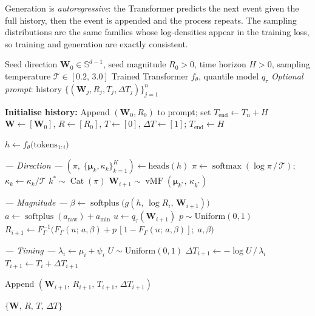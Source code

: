 \documentclass[11pt,a4paper]{article}
\newcommand{\bW}{\boldsymbol{W}}
\newcommand{\bmu}{\boldsymbol{\mu}}
\DeclareMathOperator{\vMF}{vMF}
\DeclareMathOperator{\Cat}{Cat}
\DeclareMathOperator{\softmax}{softmax}
\DeclareMathOperator{\softplus}{softplus}
\begin{document}
Generation is \emph{autoregressive}: the Transformer predicts the next
event given the full history, then the event is appended and the process
repeats.  The sampling distributions are the same families whose
log-densities appear in the training loss, so training and generation
are exactly consistent.

\begin{algorithm}[H]
\caption{Autoregressive cascade generation}\label{alg:generate}
\begin{algorithmic}[1]

\Require Seed direction $\bW_0 \in \mathbb{S}^{d-1}$,
         seed magnitude $R_0 > 0$,
         time horizon $H > 0$,
         sampling temperature $\mathcal{T} \in [0.2,\,3.0]$
\Require Trained Transformer $f_\theta$, quantile model $q_\tau$
\Require \textit{Optional prompt}:
         history $\{(\bW_j, R_j, T_j, \Delta T_j)\}_{j=1}^{n}$

\Statex
\State \textbf{Initialise history:}
  \State Append $(\bW_0, R_0)$ to prompt;
         set $T_{\text{end}} \gets T_n + H$
\Else
  \State $\bW \gets [\bW_0]$,\; $R \gets [R_0]$,\;
         $T \gets [0]$,\; $\Delta T \gets [1]$;\;
         $T_{\text{end}} \gets H$
\EndIf

\Statex
{}

  \Statex
  \State $h \gets f_\theta\!\bigl(\text{tokens}_{1:i}\bigr)$

  \Statex \textit{--- Direction ---}
  \State $(\pi,\;\{\bmu_k,\kappa_k\}_{k=1}^K) \gets \text{heads}(h)$
  \State $\pi \gets \softmax(\log\pi\,/\,\mathcal{T})$;
         \quad $\kappa_k \gets \kappa_k / \mathcal{T}$
  \State $k^* \sim \Cat(\pi)$
  \State $\bW_{i+1} \sim \vMF(\bmu_{k^*},\,\kappa_{k^*})$

  \Statex \textit{--- Magnitude ---}
  \State $\beta \gets \softplus\!\bigl(g(h,\,\log R_i,\,\bW_{i+1})\bigr)$
  \State $a \gets \softplus(a_{\text{raw}}) + a_{\min}$
  \State $u \gets q_\tau(\bW_{i+1})$
  \State $p \sim \text{Uniform}(0,1)$
  \State $R_{i+1} \gets F_\Gamma^{-1}\!\bigl(
           F_\Gamma(u;\,a,\beta) + p\,[1 - F_\Gamma(u;\,a,\beta)]
         ;\;a,\beta\bigr)$

  \Statex \textit{--- Timing ---}
  \State $\lambda_i \gets \mu_i + \psi_i$
  \State $U \sim \text{Uniform}(0,1)$
  \State $\Delta T_{i+1} \gets -\log U \,/\, \lambda_i$
  \State $T_{i+1} \gets T_i + \Delta T_{i+1}$

  \Statex
  \State Append $(\bW_{i+1},\,R_{i+1},\,T_{i+1},\,\Delta T_{i+1})$
\EndWhile

\Statex
\State \Return $\{\bW,\, R,\, T,\, \Delta T\}$
\end{algorithmic}
\end{algorithm}
\end{document}
